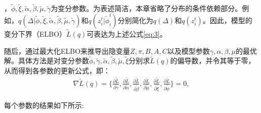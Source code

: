 ，$\widetilde{\phi}, \widetilde{\xi}, \widetilde{\alpha}, \widetilde{\beta}, \widetilde{\mu}, \widetilde{\gamma}$为变分参数。为表述简洁，本章省略了分布的条件依赖部分。例如，$q(\Delta|\widetilde{\phi},\widetilde{\xi},\widetilde{\alpha},\widetilde{\beta},\widetilde{\mu},\widetilde{\gamma})$和$q(z_i^t|\widetilde{\phi}_i^t)$分别简化为$q(\Delta)$和$q(z_i^t)$。因此，模型的变分下界（ELBO）$\widetilde{L}(q)$可表达为上述公式\ref{eq:3}。

随后，通过最大化ELBO来推导出隐变量$Z, \pi, B, A, C$以及模型参数$\gamma, \alpha, \beta, \mu$的最优解。具体方法是对变分参数$\widetilde{\phi}, \widetilde{\gamma}, \widetilde{\alpha}, \widetilde{\beta}, \widetilde{\mu}, \widetilde{\xi}$分别求$\widetilde{L}(q)$的偏导数，并令其等于零，从而得到各参数的更新公式，即：
\begin{equation}
\begin{split}
\nabla \widetilde{L}(q) = \{ \frac{\partial \widetilde{L}}{\partial \widetilde{\gamma}}, \frac{\partial \widetilde{L}}{\partial \widetilde{\alpha}}, \frac{\partial \widetilde{L}}{\partial \widetilde{\beta}}, \frac{\partial \widetilde{L}}{\partial \widetilde{\mu}}, \frac{\partial \widetilde{L}}{\partial \widetilde{\xi}}, \frac{\partial \widetilde{L}}{\partial \widetilde{\phi}} \} = 0 ,
\end{split}
\end{equation}

每个参数的结果如下所示:

